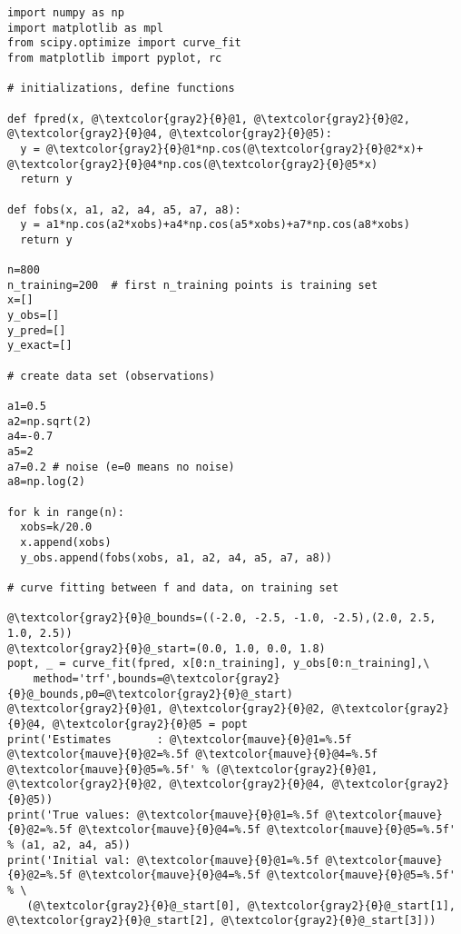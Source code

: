 \documentclass[oneside,10pt]{book}
\renewcommand{\arraystretch}{1.4} %
\begin{document}
\renewcommand{\arraystretch}{1.0} %
\renewcommand{\arraystretch}{1.4} %


%

\begin{lstlisting}[escapechar=@]
import numpy as np
import matplotlib as mpl
from scipy.optimize import curve_fit
from matplotlib import pyplot, rc

# initializations, define functions

def fpred(x, @\textcolor{gray2}{θ}@1, @\textcolor{gray2}{θ}@2, @\textcolor{gray2}{θ}@4, @\textcolor{gray2}{θ}@5):
  y = @\textcolor{gray2}{θ}@1*np.cos(@\textcolor{gray2}{θ}@2*x)+ @\textcolor{gray2}{θ}@4*np.cos(@\textcolor{gray2}{θ}@5*x) 
  return y

def fobs(x, a1, a2, a4, a5, a7, a8):   
  y = a1*np.cos(a2*xobs)+a4*np.cos(a5*xobs)+a7*np.cos(a8*xobs)  
  return y

n=800
n_training=200  # first n_training points is training set
x=[]
y_obs=[]
y_pred=[]
y_exact=[]

# create data set (observations)

a1=0.5 
a2=np.sqrt(2)
a4=-0.7 
a5=2
a7=0.2 # noise (e=0 means no noise)
a8=np.log(2)

for k in range(n):
  xobs=k/20.0
  x.append(xobs)
  y_obs.append(fobs(xobs, a1, a2, a4, a5, a7, a8)) 

# curve fitting between f and data, on training set

@\textcolor{gray2}{θ}@_bounds=((-2.0, -2.5, -1.0, -2.5),(2.0, 2.5, 1.0, 2.5))
@\textcolor{gray2}{θ}@_start=(0.0, 1.0, 0.0, 1.8)
popt, _ = curve_fit(fpred, x[0:n_training], y_obs[0:n_training],\
    method='trf',bounds=@\textcolor{gray2}{θ}@_bounds,p0=@\textcolor{gray2}{θ}@_start) 
@\textcolor{gray2}{θ}@1, @\textcolor{gray2}{θ}@2, @\textcolor{gray2}{θ}@4, @\textcolor{gray2}{θ}@5 = popt
print('Estimates       : @\textcolor{mauve}{θ}@1=%.5f @\textcolor{mauve}{θ}@2=%.5f @\textcolor{mauve}{θ}@4=%.5f @\textcolor{mauve}{θ}@5=%.5f' % (@\textcolor{gray2}{θ}@1, @\textcolor{gray2}{θ}@2, @\textcolor{gray2}{θ}@4, @\textcolor{gray2}{θ}@5))
print('True values: @\textcolor{mauve}{θ}@1=%.5f @\textcolor{mauve}{θ}@2=%.5f @\textcolor{mauve}{θ}@4=%.5f @\textcolor{mauve}{θ}@5=%.5f' % (a1, a2, a4, a5))
print('Initial val: @\textcolor{mauve}{θ}@1=%.5f @\textcolor{mauve}{θ}@2=%.5f @\textcolor{mauve}{θ}@4=%.5f @\textcolor{mauve}{θ}@5=%.5f' % \
   (@\textcolor{gray2}{θ}@_start[0], @\textcolor{gray2}{θ}@_start[1], @\textcolor{gray2}{θ}@_start[2], @\textcolor{gray2}{θ}@_start[3]))


\end{lstlisting}
\end{document}
